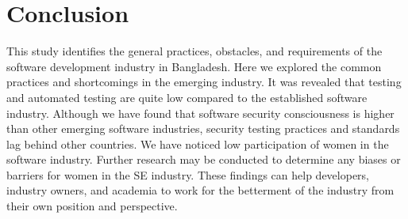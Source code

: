 \section{Conclusion}
\label{conclusion}

This study identifies the general practices, obstacles, and requirements of the software development industry in Bangladesh. Here  we explored the common practices and shortcomings in the emerging industry. It was revealed that testing and automated testing are quite low compared to the established software industry. Although we have found that software security consciousness is higher than other emerging software industries, security testing practices and standards lag behind other countries. We have noticed low participation of women in the software industry. Further research may be conducted to determine any biases or barriers for women in the SE industry. These findings can help developers, industry owners, and academia to work for the betterment of the industry from their own position and perspective.